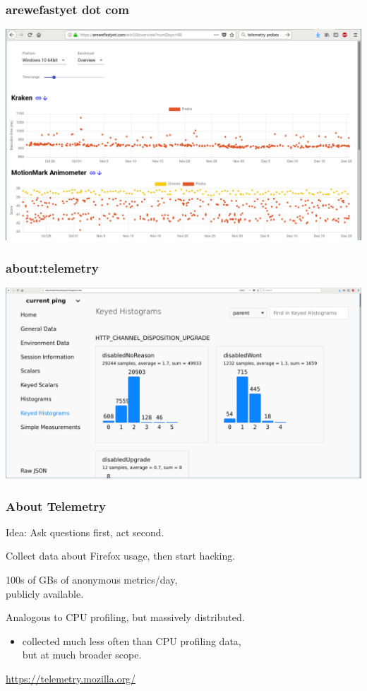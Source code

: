 \begin{frame}
\frametitle{arewefastyet dot com}
\includegraphics[width=.99\textwidth]{images/L19-arewefastyet.png}
\end{frame}

\begin{frame}
\frametitle{about:telemetry}
\includegraphics[width=.99\textwidth]{images/L19-about-telemetry.png}
\end{frame}

\begin{frame}
\frametitle{About Telemetry}
\Large
Idea: Ask questions first, act second.

Collect data about Firefox usage, then start hacking.

100s of GBs of anonymous metrics/day, \\
publicly available.

Analogous to CPU profiling, but massively distributed.
\begin{itemize}
\item collected much less often than CPU profiling data,\\
but at much broader scope.
\end{itemize}
\begin{center}
\url{https://telemetry.mozilla.org/}
\end{center}
\end{frame}

